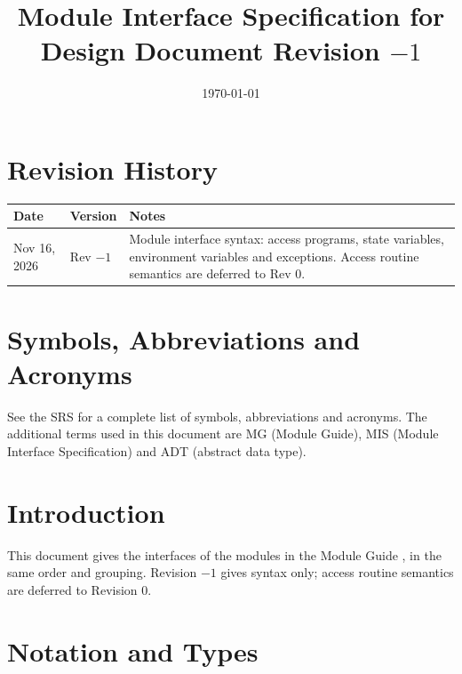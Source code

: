 \documentclass[12pt, titlepage]{article}
\begin{document}
\sloppy

\title{Module Interface Specification for \progname{}\\ \large Design Document Revision $-1$}
\author{\authname}
\date{\today}

\maketitle


\section{Revision History}

\begin{tabularx}{\textwidth}{p{3cm} p{3cm} X}
\toprule
\textbf{Date} & \textbf{Version} & \textbf{Notes}\\
\midrule
Nov 16, 2026 & Rev $-1$ & Module interface syntax: access programs, state variables, environment variables and exceptions. Access routine semantics are deferred to Rev 0.\\
\bottomrule
\end{tabularx}

\newpage
\section{Symbols, Abbreviations and Acronyms}

See the SRS \citep{TandemSRS}
for a complete list of symbols, abbreviations and acronyms. The additional terms
used in this document are MG (Module Guide), MIS (Module Interface
Specification) and ADT (abstract data type).

\newpage
\tableofcontents
\newpage


\section{Introduction}

This document gives the interfaces of the modules in the
Module Guide \citep{TandemMG}, in the same order and grouping. Revision $-1$ gives syntax only; access routine
semantics are deferred to Revision 0.

\section{Notation and Types}
\end{document}
